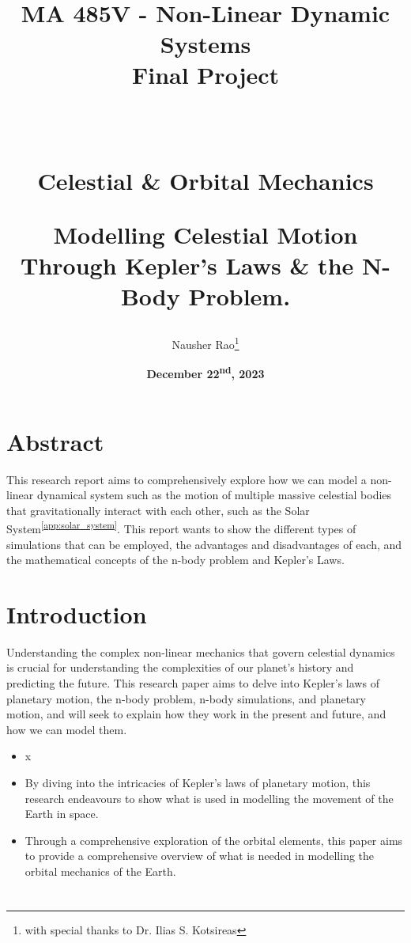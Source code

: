 \documentclass[12pt]{article}
\title { 
    \normalsize \textsc{}
    \\ [2.0cm]
    \HRule {3pt} \\
    \LARGE \textbf {
        MA 485V - Non-Linear Dynamic Systems \\
        Final Project \\
    }

    \HRule{3pt} \\ [0.5cm]
    
    {
        \textbf {
            Celestial \& Orbital Mechanics
        }

        {
            Modelling Celestial Motion Through Kepler's Laws \& the N-Body Problem.
        }
    }
}
\author {
    Nausher Rao\thanks{with special thanks to Dr. Ilias S. Kotsireas}
}
\date {
    \textbf{December 22\textsuperscript{nd}, 2023}
}
\newcommand{\sref}[1]{\textsuperscript{\ref{#1}}}
\begin{document}
\maketitle
\newpage
\tableofcontents


\begin{spacing}{1.25}
\newpage
\section{Abstract}
\par {
    This research report aims to comprehensively explore how we can model a non-linear dynamical system such as the motion of multiple massive celestial bodies that gravitationally interact with each other, such as the Solar System\sref{app:solar_system}. This report wants to show the different types of simulations that can be employed, the advantages and disadvantages of each, and the mathematical concepts of the n-body problem and Kepler's Laws.
}


\newpage
\section{Introduction}
\par {
    Understanding the complex non-linear mechanics that govern celestial dynamics is crucial for understanding the complexities of our planet's history and predicting the future. This research paper aims to delve into Kepler's laws of planetary motion, the n-body problem, n-body simulations, and planetary motion, and will seek to explain how they work in the present and future, and how we can model them. 
    \begin{itemize}
      \item x
    
      \item By diving into the intricacies of Kepler's laws of planetary motion, this research endeavours to show what is used in modelling the movement of the Earth in space.
      
      \item Through a comprehensive exploration of the orbital elements, this paper aims to provide a comprehensive overview of what is needed in modelling the orbital mechanics of the Earth. 
    \end{itemize}
}

\newpage
\section{}

\end{spacing}
\end{document}
